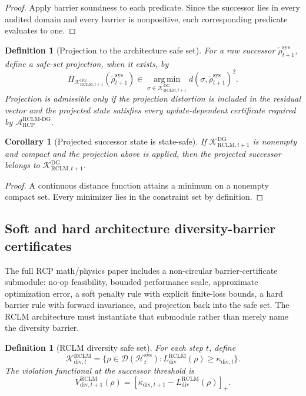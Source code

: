 \documentclass[11pt,a4paper]{article}
\newtheorem{corollary}[theorem]{Corollary}
\newtheorem{definition}[theorem]{Definition}
\newcommand{\D}{\mathcal D}
\newcommand{\Hcal}{\mathcal H}
\newcommand{\Acal}{\mathcal A}
\newcommand{\Kcal}{\mathcal K}
\newcommand{\argmin}{\operatorname*{arg\,min}}
\newcommand{\RCP}{\mathrm{RCP}}
\newcommand{\RCLM}{\mathrm{RCLM}}
\newcommand{\DG}{\mathrm{DG}}
\newcommand{\sys}{\mathrm{sys}}
\begin{document}
\begin{proof}
Apply barrier soundness to each predicate. Since the successor lies in every audited domain and every barrier is nonpositive, each corresponding predicate evaluates to one.
\end{proof}

\begin{definition}[Projection to the architecture safe set]
For a raw successor \(\widetilde\rho_{t+1}^{\sys}\), define a safe-set projection, when it exists, by
\[
\Pi_{\Kcal_{\RCLM,t+1}^{\DG}}(\widetilde\rho_{t+1}^{\sys})
\in
\argmin_{\sigma\in\Kcal_{\RCLM,t+1}^{\DG}}d(\sigma,\widetilde\rho_{t+1}^{\sys})^2.
\]
Projection is admissible only if the projection distortion is included in the residual vector and the projected state satisfies every update-dependent certificate required by \(\Acal_{\RCP}^{\RCLM\text{-}\DG}\).
\end{definition}

\begin{corollary}[Projected successor state is state-safe]
If \(\Kcal_{\RCLM,t+1}^{\DG}\) is nonempty and compact and the projection above is applied, then the projected successor belongs to \(\Kcal_{\RCLM,t+1}^{\DG}\).
\end{corollary}

\begin{proof}
A continuous distance function attains a minimum on a nonempty compact set. Every minimizer lies in the constraint set by definition.
\end{proof}

\subsection{Soft and hard architecture diversity-barrier certificates}
\label{subsec:rclm_soft_hard_diversity_barriers}

The full RCP math/physics paper includes a non-circular barrier-certificate submodule: no-op feasibility, bounded performance scale, approximate optimization error, a soft penalty rule with explicit finite-loss bounds, a hard barrier rule with forward invariance, and projection back into the safe set.  The RCLM architecture must instantiate that submodule rather than merely name the diversity barrier.

\begin{definition}[RCLM diversity safe set]
For each step \(t\), define
\[
\Kcal_{\mathrm{div},t}^{\RCLM}
=
\{\rho\in\D(\Hcal_t^{\sys}):L_{\mathrm{div}}^{\RCLM}(\rho)\ge\kappa_{\mathrm{div},t}\}.
\]
The violation functional at the successor threshold is
\[
V_{\mathrm{div},t+1}^{\RCLM}(\rho)
=
[\kappa_{\mathrm{div},t+1}-L_{\mathrm{div}}^{\RCLM}(\rho)]_+.
\]
\end{definition}
\end{document}
